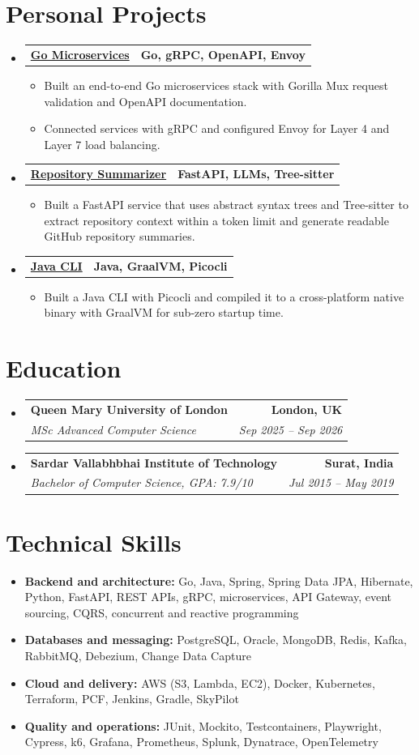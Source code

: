 \documentclass[a4paper,10pt]{article}
\makeatletter
\newcommand{\resumeItem}[1]{\item\small #1}
\newcommand{\resumeSubheading}[4]{
  \item[]
  \begin{tabular*}{\textwidth}{l@{\extracolsep{\fill}}r}
    \textbf{#1} & \textbf{\small #2} \\
    \textit{\small #3} & \textit{\small #4}
  \end{tabular*}\vspace{-3pt}
}
\newcommand{\resumeProjectHeading}[2]{
  \item[]
  \begin{tabular*}{\textwidth}{l@{\extracolsep{\fill}}r}
    \textbf{#1} & \textbf{\small #2}
  \end{tabular*}\vspace{-4pt}
}
\newcommand{\resumeSubHeadingListStart}{\begin{itemize}[leftmargin=0pt,label={},itemsep=1pt,topsep=1pt]}
\newcommand{\resumeSubHeadingListEnd}{\end{itemize}}
\newcommand{\resumeItemListStart}{\begin{itemize}[leftmargin=14pt,itemsep=1.4pt,topsep=2pt,parsep=0pt]}
\newcommand{\resumeItemListEnd}{\end{itemize}\vspace{1pt}}
\makeatother
\begin{document}
\section{Personal Projects}
\resumeSubHeadingListStart
  \resumeProjectHeading{\href{https://github.com/aymanapatel/golang-microservices}{Go Microservices}}{Go, gRPC, OpenAPI, Envoy}
  \resumeItemListStart
    \resumeItem{Built an end-to-end Go microservices stack with Gorilla Mux request validation and OpenAPI documentation.}
    \resumeItem{Connected services with gRPC and configured Envoy for Layer 4 and Layer 7 load balancing.}
  \resumeItemListEnd

  \resumeProjectHeading{\href{https://github.com/aymanapatel/nebius-project}{Repository Summarizer}}{FastAPI, LLMs, Tree-sitter}
  \resumeItemListStart
    \resumeItem{Built a FastAPI service that uses abstract syntax trees and Tree-sitter to extract repository context within a token limit and generate readable GitHub repository summaries.}
  \resumeItemListEnd

  \resumeProjectHeading{\href{https://github.com/aymanapatel/java-cli}{Java CLI}}{Java, GraalVM, Picocli}
  \resumeItemListStart
    \resumeItem{Built a Java CLI with Picocli and compiled it to a cross-platform native binary with GraalVM for sub-zero startup time.}
  \resumeItemListEnd
\resumeSubHeadingListEnd

\section{Education}
\resumeSubHeadingListStart
  \resumeSubheading{Queen Mary University of London}{London, UK}{MSc Advanced Computer Science}{Sep 2025 -- Sep 2026}
  \resumeSubheading{Sardar Vallabhbhai Institute of Technology}{Surat, India}{Bachelor of Computer Science, GPA: 7.9/10}{Jul 2015 -- May 2019}
\resumeSubHeadingListEnd

\section{Technical Skills}
\begin{itemize}[leftmargin=0pt,label={},itemsep=2pt,topsep=1pt]
  \small
  \item \textbf{Backend and architecture:} Go, Java, Spring, Spring Data JPA, Hibernate, Python, FastAPI, REST APIs, gRPC, microservices, API Gateway, event sourcing, CQRS, concurrent and reactive programming
  \item \textbf{Databases and messaging:} PostgreSQL, Oracle, MongoDB, Redis, Kafka, RabbitMQ, Debezium, Change Data Capture
  \item \textbf{Cloud and delivery:} AWS (S3, Lambda, EC2), Docker, Kubernetes, Terraform, PCF, Jenkins, Gradle, SkyPilot
  \item \textbf{Quality and operations:} JUnit, Mockito, Testcontainers, Playwright, Cypress, k6, Grafana, Prometheus, Splunk, Dynatrace, OpenTelemetry
\end{itemize}
\end{document}
